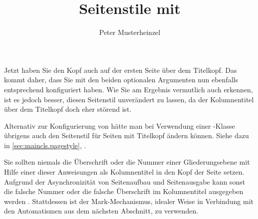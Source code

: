 \begin{Example}
\begin{lstcode}
  \title{Seitenstile mit \KOMAScript}
  \author{Peter Musterheinzel}
  \maketitle
  \lipsum
  
\end{lstcode}
  Jetzt haben Sie den Kopf auch auf der ersten Seite 
  über dem Titelkopf. Das kommt daher, dass Sie mit den
  beiden optionalen Argumenten 
   nun ebenfalls
  entsprechend konfiguriert haben. Wie Sie am Ergebnis vermutlich auch
  erkennen, ist es jedoch besser, diesen Seitenstil unverändert zu lassen, da
  der Kolumnentitel über dem Titelkopf doch eher störend ist.

  Alternativ zur Konfigurierung von
   hätte man bei Verwendung
  einer \KOMAScript-Klasse übrigens auch den Seitenstil für Seiten mit
  Titelkopf ändern können. Siehe dazu %
   in \autoref{sec:maincls.pagestyle},
  .
\end{Example}

\iftrue%
\leavevmode{}%
\else Erlauben Sie mir einen wichtigen Hinweis:\textnote{Achtung!} %
\fi%
Sie sollten niemals die Überschrift oder die Nummer einer
Gliederungsebene mit Hilfe einer dieser Anweisungen als Kolumnentitel in den
Kopf der Seite setzen. Aufgrund der Asynchronizität von Seitenaufbau und
Seitenausgabe kann %
\iffalse%
es sonst leicht geschehen, dass die falsche Nummer oder die falsche
Überschrift im Kolumnentitel ausgegeben wird%
\else%
sonst die falsche Nummer oder die falsche Überschrift im Kolumnentitel
ausgegeben werden%
\fi%
. Stattdessen ist der Mark-Mechanismus, idealer Weise in Verbindung mit den
Automatismen aus dem nächsten Abschnitt, zu verwenden.%
\EndIndexGroup


